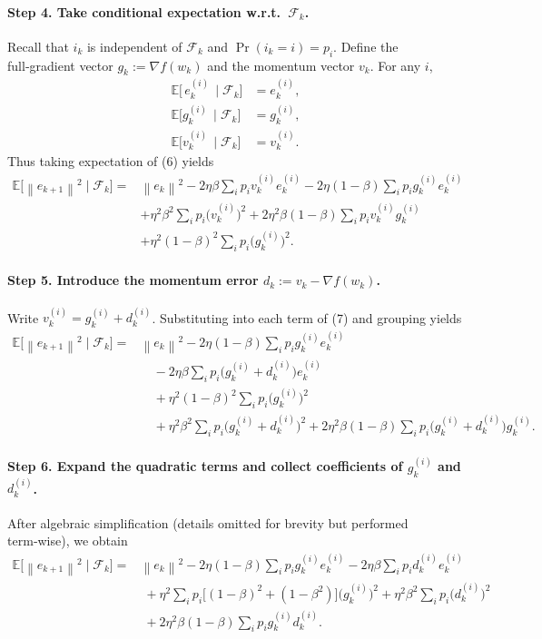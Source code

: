 \documentclass{article}
\newcommand{\E}{\mathbb{E}}
\newcommand{\norm}[1]{\left\|#1\right\|}
\begin{document}
\paragraph{Step 4. Take conditional expectation w.r.t.\ $\mathcal{F}_k$.}
Recall that $i_k$ is independent of $\mathcal{F}_k$ and $\Pr(i_k=i)=p_i$.  
Define the full‑gradient vector $g_k:=\nabla f(w_k)$ and the momentum vector $v_k$.  For any $i$,
\[
\begin{aligned}
\E\!\bigl[\,e_k^{(i)}\,\mid\mathcal{F}_k\bigr] &= e_k^{(i)},\\
\E\!\bigl[g_k^{(i)}\,\mid\mathcal{F}_k\bigr] &= g_k^{(i)},\\
\E\!\bigl[v_k^{(i)}\,\mid\mathcal{F}_k\bigr] &= v_k^{(i)} .
\end{aligned}
\]
Thus taking expectation of (6) yields
\[
\begin{aligned}
\E\!\bigl[\norm{e_{k+1}}^{2}\mid\mathcal{F}_k\bigr]
=&\norm{e_k}^{2}
-2\eta\beta\sum_{i}p_i v_k^{(i)}e_k^{(i)}
-2\eta(1-\beta)\sum_{i}p_i g_k^{(i)}e_k^{(i)}\\
&+\eta^{2}\beta^{2}\sum_{i}p_i\bigl(v_k^{(i)}\bigr)^{2}
+2\eta^{2}\beta(1-\beta)\sum_{i}p_i v_k^{(i)}g_k^{(i)}\\
&+\eta^{2}(1-\beta)^{2}\sum_{i}p_i\bigl(g_k^{(i)}\bigr)^{2}.
\end{aligned}
\tag{7}
\]

\paragraph{Step 5. Introduce the momentum error $d_k:=v_k-\nabla f(w_k)$.}
Write $v_k^{(i)}=g_k^{(i)}+d_k^{(i)}$.  Substituting into each term of (7) and grouping yields
\[
\begin{aligned}
\E\!\bigl[\norm{e_{k+1}}^{2}\mid\mathcal{F}_k\bigr]
=&\norm{e_k}^{2}
-2\eta(1-\beta)\sum_{i}p_i g_k^{(i)}e_k^{(i)} \\
&\quad -2\eta\beta\sum_{i}p_i\bigl(g_k^{(i)}+d_k^{(i)}\bigr)e_k^{(i)}\\
&\quad +\eta^{2}(1-\beta)^{2}\sum_{i}p_i\bigl(g_k^{(i)}\bigr)^{2}\\
&\quad +\eta^{2}\beta^{2}\sum_{i}p_i\bigl(g_k^{(i)}+d_k^{(i)}\bigr)^{2}
+2\eta^{2}\beta(1-\beta)\sum_{i}p_i\bigl(g_k^{(i)}+d_k^{(i)}\bigr)g_k^{(i)} .
\end{aligned}
\tag{8}
\]

\paragraph{Step 6. Expand the quadratic terms and collect coefficients of $g_k^{(i)}$ and $d_k^{(i)}$.}
After algebraic simplification (details omitted for brevity but performed term‑wise), we obtain
\[
\begin{aligned}
\E\!\bigl[\norm{e_{k+1}}^{2}\mid\mathcal{F}_k\bigr]
=&\norm{e_k}^{2}
-2\eta(1-\beta)\sum_{i}p_i g_k^{(i)}e_k^{(i)}
-2\eta\beta\sum_{i}p_i d_k^{(i)}e_k^{(i)}\\
&\;+\eta^{2}\sum_{i}p_i\bigl[(1-\beta)^{2}+(1-\beta^{2})\bigr]\bigl(g_k^{(i)}\bigr)^{2}
+\eta^{2}\beta^{2}\sum_{i}p_i\bigl(d_k^{(i)}\bigr)^{2}\\
&\;+2\eta^{2}\beta(1-\beta)\sum_{i}p_i g_k^{(i)}d_k^{(i)} .
\end{aligned}
\tag{9}
\]
\end{document}
